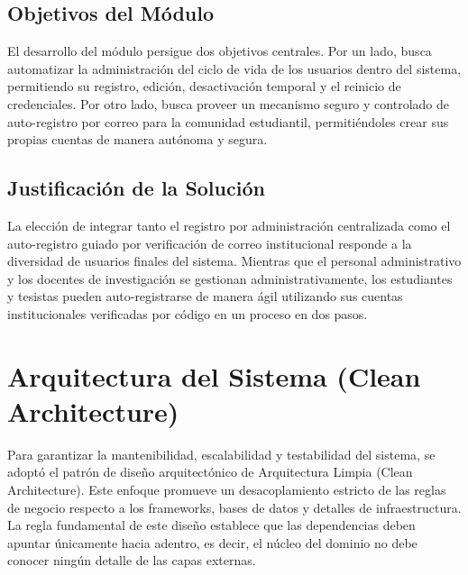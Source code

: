 \documentclass[12pt,letterpaper]{article}
\begin{document}
\subsection{Objetivos del Módulo}
El desarrollo del módulo persigue dos objetivos centrales. Por un lado, busca automatizar la administración del ciclo de vida de los usuarios dentro del sistema, permitiendo su registro, edición, desactivación temporal y el reinicio de credenciales. Por otro lado, busca proveer un mecanismo seguro y controlado de auto-registro por correo para la comunidad estudiantil, permitiéndoles crear sus propias cuentas de manera autónoma y segura.

\subsection{Justificación de la Solución}
La elección de integrar tanto el registro por administración centralizada como el auto-registro guiado por verificación de correo institucional responde a la diversidad de usuarios finales del sistema. Mientras que el personal administrativo y los docentes de investigación se gestionan administrativamente, los estudiantes y tesistas pueden auto-registrarse de manera ágil utilizando sus cuentas institucionales verificadas por código en un proceso en dos pasos.

\newpage

\section{Arquitectura del Sistema (Clean Architecture)}
Para garantizar la mantenibilidad, escalabilidad y testabilidad del sistema, se adoptó el patrón de diseño arquitectónico de Arquitectura Limpia (Clean Architecture). Este enfoque promueve un desacoplamiento estricto de las reglas de negocio respecto a los frameworks, bases de datos y detalles de infraestructura. La regla fundamental de este diseño establece que las dependencias deben apuntar únicamente hacia adentro, es decir, el núcleo del dominio no debe conocer ningún detalle de las capas externas.
\end{document}
